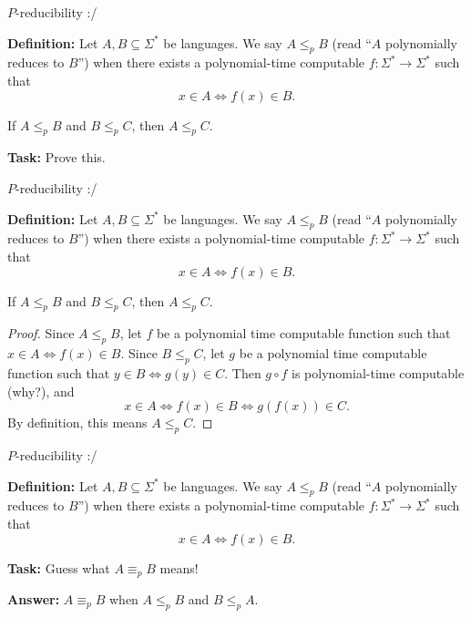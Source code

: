 \documentclass{beamer}
\begin{document}
\begin{frame}{$P$-reducibility :/} 

\textbf{Definition:} Let $A, B \subseteq \Sigma^*$ be languages. We say $A \leq_p B$ (read ``$A$ polynomially reduces to $B$'') when there exists a polynomial-time computable $f: \Sigma^* \to \Sigma^*$ such that
$$x \in A \Leftrightarrow f(x) \in B.$$

\begin{theorem}
If $A \leq_p B$ and $B \leq_p C$, then $A \leq_p C$. 
\end{theorem}

\textbf{Task:} Prove this. 

\end{frame}

\begin{frame}{$P$-reducibility :/} 

\textbf{Definition:} Let $A, B \subseteq \Sigma^*$ be languages. We say $A \leq_p B$ (read ``$A$ polynomially reduces to $B$'') when there exists a polynomial-time computable $f: \Sigma^* \to \Sigma^*$ such that
$$x \in A \Leftrightarrow f(x) \in B.$$

\begin{theorem}
If $A \leq_p B$ and $B \leq_p C$, then $A \leq_p C$. 
\end{theorem}
\begin{proof}
Since $A \leq_p B$, let $f$ be a polynomial time computable function such that
$x \in A \Leftrightarrow f(x) \in B$. Since $B \leq_p C$, let $g$ be a polynomial time computable function such that $y \in B \Leftrightarrow g(y) \in C$.
Then $g \circ f$ is polynomial-time computable (why?), and
$$x \in A \Leftrightarrow f(x) \in B \Leftrightarrow g(f(x)) \in C.$$
By definition, this means $A \leq_p C$.
\end{proof}

\end{frame}

\begin{frame}{$P$-reducibility :/} 

\textbf{Definition:} Let $A, B \subseteq \Sigma^*$ be languages. We say $A \leq_p B$ (read ``$A$ polynomially reduces to $B$'') when there exists a polynomial-time computable $f: \Sigma^* \to \Sigma^*$ such that
$$x \in A \Leftrightarrow f(x) \in B.$$

\textbf{Task:} Guess what $A \equiv_p B$ means!

\pause

\textbf{Answer:} $A \equiv_p B$ when $A \leq_p B$ and $B \leq_p A$.

\end{frame}
\end{document}
